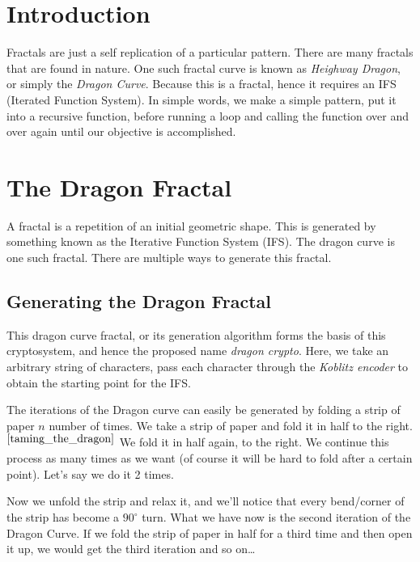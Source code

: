 \documentclass[a4paper,12pt]{article}
\begin{document}
\section{Introduction}
\begin{flushleft}
    Fractals are just a self replication of a particular pattern. There are many fractals that are found in nature. One such fractal curve is known as \textit{Heighway Dragon}, or simply the \textit{Dragon Curve}. Because this is a fractal, hence it requires an IFS (Iterated Function System). In simple words, we make a simple pattern, put it into a recursive function, before running a loop and calling the function over and over again until our objective is accomplished.
\end{flushleft}

\section{The Dragon Fractal}
\begin{flushleft}
        A fractal is a repetition of an initial geometric shape. This is generated by something known as the Iterative Function System (IFS). The dragon curve is one such fractal. There are multiple ways to generate this fractal. 
\end{flushleft}

\subsection{Generating the Dragon Fractal}
\begin{flushleft}
    This dragon curve fractal, or its generation algorithm forms the basis of this cryptosystem, and hence the proposed name \textit{dragon crypto}. Here, we take an arbitrary string of characters, pass each character through the \textit{Koblitz encoder} to obtain the starting point for the IFS.
\end{flushleft}

\begin{flushleft}
	The iterations of the Dragon curve can easily be generated by folding a strip of paper $n$ number of times. We take a strip of paper and fold it in half to the right.$^{\cite{taming_the_dragon}}$ We fold it in half again, to the right. We continue this process as many times as we want (of course it will be hard to fold after a certain point). Let’s say we do it 2 times.
\end{flushleft}

\begin{flushleft}
    Now we unfold the strip and relax it, and we’ll notice that every bend/corner of the strip has become a $90^{\circ}$ turn. What we have now is the second iteration of the Dragon Curve. If we fold the strip of paper in half for a third time and then open it up, we would get the third iteration and so on…
\end{flushleft}
\end{document}
